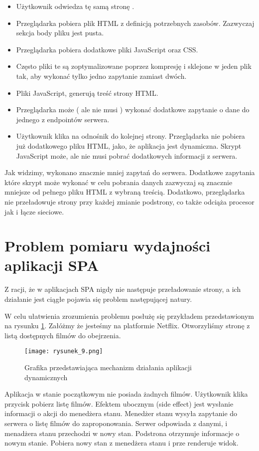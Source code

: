 \begin{itemize}
    \item Użytkownik odwiedza tę samą stronę .
    \item Przeglądarka pobiera plik HTML z definicją potrzebnych zasobów. Zazwyczaj sekcja body pliku jest pusta.
    \item Przeglądarka pobiera dodatkowe pliki JavaScript oraz CSS.
    \item Często pliki te są zoptymalizowane poprzez kompresję i sklejone w jeden plik tak, aby wykonać tylko jedno zapytanie zamiast dwóch.
    \item Pliki JavaScript, generują treść strony HTML.
    \item Przeglądarka może ( ale nie musi ) wykonać dodatkowe zapytanie o dane do jednego z endpointów serwera.
    \item Użytkownik klika na odnośnik do kolejnej strony. Przeglądarka nie pobiera już dodatkowego pliku HTML, jako, że aplikacja jest dynamiczna. Skrypt JavaScript może, ale nie musi pobrać dodatkowych informacji z serwera.    
\end{itemize}

Jak widzimy, wykonano znacznie mniej zapytań do serwera. Dodatkowe zapytania które skrypt może wykonać w celu pobrania danych zazwyczaj są znacznie mniejsze od pełnego pliku HTML z wybraną treścią.
Dodatkowo, przeglądarka nie przeładowuje strony przy każdej zmianie podstrony, co także odciąża procesor jak i łącze sieciowe.

\section{Problem pomiaru wydajności aplikacji SPA}

Z racji, że w aplikacjach SPA nigdy nie następuje przeładowanie strony, a ich działanie jest ciągłe pojawia się problem następującej natury. 

W celu ułatwienia zrozumienia problemu posłużę się przykładem przedstawionym na rysunku \ref{fig:rysunek_9}. Załóżmy że jesteśmy na platformie Netflix. Otworzyliśmy stronę z listą dostępnych filmów do obejrzenia. 

\begin{figure}[htbp]
    \centering
    \texttt{[image: rysunek\_9.png]}
    \caption{Grafika przedstawiająca mechanizm działania aplikacji dynamicznych}
    \label{fig:rysunek_9}
\end{figure}

Aplikacja w stanie początkowym nie posiada żadnych filmów. Użytkownik klika przycisk pobierz listę filmów. Efektem ubocznym (side effect)  jest wysłanie informacji o akcji do menedżera stanu.
Menedżer stanu wysyła zapytanie do serwera o listę filmów do zaproponowania. Serwer odpowiada z danymi, i menadżera stanu przechodzi w nowy stan.
Podstrona otrzymuje informacje o nowym stanie. Pobiera nowy stan z menedżera stanu i prze renderuje widok.

